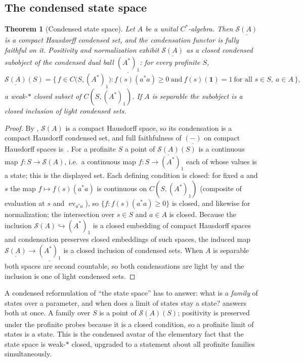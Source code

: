 \documentclass[12pt]{article}
\newcommand{\cond}[1]{\underline{#1}}          %
\newcommand{\St}{\mathcal{S}}                   %
\newcommand{\id}{\mathbf{1}}
\DeclareMathOperator{\ev}{ev}
\theoremstyle{plain}
\newtheorem{progthm}{Theorem}
\begin{document}
\subsection{The condensed state space}

\begin{progthm}[Condensed state space]
\label{thm:statespace}
Let $A$ be a unital $C^{*}$-algebra. Then $\cond{\St(A)}$ is a compact Hausdorff
condensed set, and the condensation functor is fully faithful on it. Positivity and
normalization exhibit $\cond{\St(A)}$ as a closed condensed subobject of the
condensed dual ball $\cond{(A^{*})_{1}}$: for every profinite $S$,
\[
  \cond{\St(A)}(S)
  = \bigl\{\, f\in C\!\bigl(S,(A^{*})_{1}\bigr) :
      f(s)(a^{*}a)\ge 0 \ \text{and}\ f(s)(\id)=1
      \ \text{for all } s\in S,\ a\in A \,\bigr\},
\]
a weak-$\ast$ closed subset of $C(S,(A^{*})_{1})$. If $A$ is separable the subobject
is a closed inclusion of light condensed sets.
\end{progthm}

\begin{proof}
By , $\St(A)$ is a compact Hausdorff space, so its condensation is
a compact Hausdorff condensed set, and full faithfulness of $\cond{(-)}$ on compact
Hausdorff spaces is~\cite{clausen-scholze-condensed}. For a profinite $S$ a point of
$\cond{\St(A)}(S)$ is a continuous map $f:S\to\St(A)$, i.e.\ a continuous map
$f:S\to(A^{*})_{1}$ each of whose values is a state; this is the displayed set. Each
defining condition is closed: for fixed $a$ and $s$ the map $f\mapsto f(s)(a^{*}a)$
is continuous on $C(S,(A^{*})_{1})$ (composite of evaluation at $s$ and $\ev_{a^{*}a}$),
so $\{f:f(s)(a^{*}a)\ge 0\}$ is closed, and likewise for normalization; the
intersection over $s\in S$ and $a\in A$ is closed. Because the inclusion
$\St(A)\hookrightarrow(A^{*})_{1}$ is a closed embedding of compact Hausdorff spaces
and condensation preserves closed embeddings of such spaces, the induced map
$\cond{\St(A)}\to\cond{(A^{*})_{1}}$ is a closed inclusion of condensed sets. When
$A$ is separable both spaces are second countable, so both condensations are light
by  and the inclusion is one of light condensed sets.
\end{proof}

\begin{remark}
A condensed reformulation of ``the state space'' has to answer: what is a
\emph{family} of states over a parameter, and when does a limit of states stay a
state?  answers both at once. A family over $S$ is a point of
$\cond{\St(A)}(S)$; positivity is preserved under the profinite probes because it is
a closed condition, so a profinite limit of states is a state. This is the condensed
avatar of the elementary fact that the state space is weak-$\ast$ closed, upgraded
to a statement about all profinite families simultaneously.
\end{remark}
\end{document}
